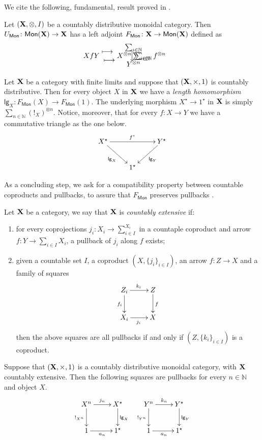 \documentclass[runningheads,envcountsect]{llncs}
\newcommand\DownArrow{\rotatebox[origin=c]{-90}{$\longrightarrow$\,}}
\newcommand\functor[1][l]{\csname#1functor\endcsname}
\newcommand\rfunctor[3]{%
	\setbox0=\hbox{$#2$}%
	\ensurestackMath{\Centerstack[c]{#1\\\mathclap{\DownArrow}\mathrlap{\,\;#2}\\#3}}%
	\kern\wd0%
}
\newcommand\functormapsto{\mathrel{\ensurestackMath{\Centerstack[c]{\longmapsto\\ \\\longmapsto}}}}
\newcommand{\lgh}{\mathsf{lg}}
\def\X{\textbf {\textup{X}}}
\newcommand{\catname}[1]{\textbf{\textup{#1}}}
\newcommand{\mono}[1]{\mathsf{Mon}(\catname{#1})}
\newcommand{\mo}[1]{{#1}_\mathsf{Mon}}
\begin{document}
We cite the following, fundamental, result proved in \cite{lack2010note}.

\begin{theorem}
	Let $(\X, \otimes, I )$ be a countably distributive monoidal category. Then $\mo{U}\colon \mono{X}\to \X$ has a left adjoint  $\mo{F}\colon \X\to \mono{X}$ defined as
\[	\functor[l]{X}{f}{Y}
\functormapsto
\rfunctor{\sum_{i\in \mathbb{N}} X^{\otimes n}}{\sum_{i\in \mathbb{N}} f^{\otimes n}}{\sum_{i\in \mathbb{N}} Y^{\otimes n}}\]
\end{theorem}


\begin{remark}\label{rem:lg} Let $\X$ be a category with finite limits and suppose that $(\X, \times, 1)$ is countably distributive.  Then for every object $X$ in $\X$ we have a \emph{length homomorphism} $\lgh_X\colon \mo{F}(X)\to \mo{F}(1)$. The underlying morphism $X^\star \to 1^\star$ in $\X$ is simply $\sum_{n\in \mathbb{N}} (!_X)^{\otimes n}$.  Notice, moreover, that for every $f\colon X\to Y$ we have a commutative triangle as the one below.
	\[\xymatrix{X^\star \ar[rr]^{f^\star} \ar[dr]_{\lgh_X}&& Y^\star  \ar[dl]^{\lgh_Y}\\ & 1^\star }\]
\end{remark}

As a concluding step, we ask for a compatibility property between countable coproducts and pullbacks, to assure that $\mo{F}$ preserves pullbacks \cite{bibid}.

\begin{definition}
	Let $\X$ be a category, we say that $\X$ is \emph{countably extensive} if:
	\begin{enumerate}
		\item  for every coprojections $j_i \colon X_i\to \sum_{i\in I}^{X_i} $ in a countaple coproduct and arrow $f\colon Y\to \sum_{i\in I} X_i$, a pullback of $j_i$ along $f$ exists; 
		\item given a countable set $I$, a coproduct $(X, \{j_i\}_{i\in I})$, an arrow $f\colon Z\to X$ and a family of squares
		\[\xymatrix{Z_i \ar[r]^{k_i} \ar[d]_{f_i} & Z\ar[d]^{f} \\ X_i \ar[r]_{j_i} & X}\]
		then the above squares are all pullbacks if and only if $(Z, \{k_i\}_{i\in I})$ is a coproduct.
	\end{enumerate} 
\end{definition}

\begin{remark}\label{rem:pb}
Suppose that  $(\X, \times, 1)$ is a countably distributive monoidal category, with $\X$ countably extensive. Then the following squares are pullbacks for every $n\in \mathbb{N}$ and object $X$.
\[\xymatrix{X^{n} \ar[r]^-{j_n} \ar[d]_{!_{X^n}}& X^\star \ar[d]^{\lgh_X} & Y^{n} \ar[r]^-{k_n} \ar[d]_{!_{Y^n}}& Y^\star \ar[d]^{\lgh_Y}\\ 1 \ar[r]_{a_n}&  1^\star & 1 \ar[r]_{a_n}&  1^\star}\]
\end{remark}
\end{document}
